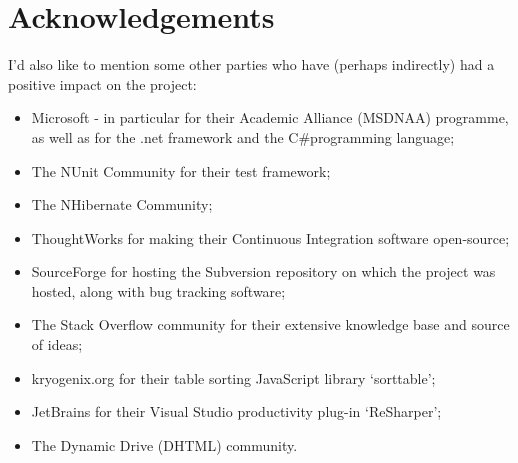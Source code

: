\documentclass{l4proj}
\newcommand{\cs}{C\#}
\begin{document}
\section*{Acknowledgements}
I'd also like to mention some other parties who have (perhaps indirectly) had a positive impact on the project: \
\begin{itemize} 
\item Microsoft - in particular for their Academic Alliance (MSDNAA) programme, as well as for the .\gls{net} framework and the \cs programming language;
\item The NUnit Community for their test framework;
\item The NHibernate Community;
\item ThoughtWorks for making their Continuous Integration software open-source;
\item SourceForge for hosting the Subversion repository on which the project was hosted, along with bug tracking software;
\item The Stack Overflow community for their extensive knowledge base and source of ideas;
\item kryogenix.org for their table sorting JavaScript library `sorttable';
\item JetBrains for their Visual Studio productivity plug-in `ReSharper';
\item The Dynamic Drive (DHTML) community.
\end{itemize}

\educationalconsent
%









\tableofcontents










\appendix

\printglossaries



\end{document}
